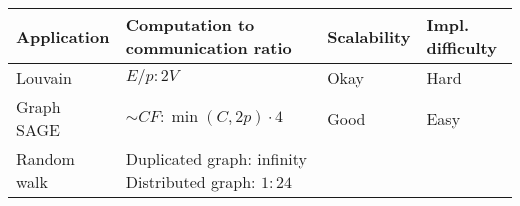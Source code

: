 \documentclass[10pt,oneside]{memoir}
\begin{document}
\begin{longtable}[]{@{}llll@{}}
\toprule
\begin{minipage}[b]{0.25\columnwidth}\raggedright
Application\strut
\end{minipage} & \begin{minipage}[b]{0.37\columnwidth}\raggedright
Computation to communication ratio\strut
\end{minipage} & \begin{minipage}[b]{0.12\columnwidth}\raggedright
Scalability\strut
\end{minipage} & \begin{minipage}[b]{0.14\columnwidth}\raggedright
Impl. difficulty\strut
\end{minipage}\tabularnewline
\midrule
\endhead
\begin{minipage}[t]{0.25\columnwidth}\raggedright
Louvain\strut
\end{minipage} & \begin{minipage}[t]{0.37\columnwidth}\raggedright
\(E/p : 2V\)\strut
\end{minipage} & \begin{minipage}[t]{0.12\columnwidth}\raggedright
Okay\strut
\end{minipage} & \begin{minipage}[t]{0.14\columnwidth}\raggedright
Hard\strut
\end{minipage}\tabularnewline
\begin{minipage}[t]{0.25\columnwidth}\raggedright
Graph SAGE\strut
\end{minipage} & \begin{minipage}[t]{0.37\columnwidth}\raggedright
\(\sim CF : \min(C, 2p) \cdot 4\)\strut
\end{minipage} & \begin{minipage}[t]{0.12\columnwidth}\raggedright
Good\strut
\end{minipage} & \begin{minipage}[t]{0.14\columnwidth}\raggedright
Easy\strut
\end{minipage}\tabularnewline
\begin{minipage}[t]{0.25\columnwidth}\raggedright
Random walk\strut
\end{minipage} & \begin{minipage}[t]{0.37\columnwidth}\raggedright
Duplicated graph: infinity \linebreak Distributed graph:
\(1 : 24\)\strut
\end{minipage} & \begin{minipage}[t]{0.12\columnwidth}\raggedright

\end{minipage}
\end{longtable}
\end{document}
